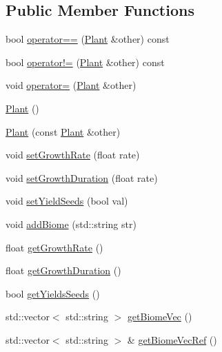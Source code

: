 \subsection*{Public Member Functions}
\begin{DoxyCompactItemize}
\item 
bool \mbox{\hyperlink{class_plant_abe475b0daf524526b9680274ea0f8e2b}{operator==}} (\mbox{\hyperlink{class_plant}{Plant}} \&other) const
\item 
bool \mbox{\hyperlink{class_plant_a6ae96ef1da51ed164d62c400cbf9aa5a}{operator!=}} (\mbox{\hyperlink{class_plant}{Plant}} \&other) const
\item 
void \mbox{\hyperlink{class_plant_a10e2417c9c0e750666146443e76623ee}{operator=}} (\mbox{\hyperlink{class_plant}{Plant}} \&other)
\item 
\mbox{\hyperlink{class_plant_aeebba67fbf33e3087e9035f41289a83a}{Plant}} ()
\item 
\mbox{\hyperlink{class_plant_a3e454c81c5a9120c4b321614b22621c1}{Plant}} (const \mbox{\hyperlink{class_plant}{Plant}} \&other)
\item 
void \mbox{\hyperlink{class_plant_af55fc2a9b7b3833ecc305f7fe19fd5dd}{set\+Growth\+Rate}} (float rate)
\item 
void \mbox{\hyperlink{class_plant_a3baeabf1c11ff1440b696cfe34f785f5}{set\+Growth\+Duration}} (float rate)
\item 
void \mbox{\hyperlink{class_plant_a21c26df7238a78906804603559f5cc04}{set\+Yield\+Seeds}} (bool val)
\item 
void \mbox{\hyperlink{class_plant_a32c7cc807dce6f0049fec8a8576a341d}{add\+Biome}} (std\+::string str)
\item 
float \mbox{\hyperlink{class_plant_a7f0844398279e81e7e65a7cea52faf45}{get\+Growth\+Rate}} ()
\item 
float \mbox{\hyperlink{class_plant_a76c9434c2b7f9a9edad3e07db344ce0f}{get\+Growth\+Duration}} ()
\item 
bool \mbox{\hyperlink{class_plant_a3144642078f06af87392cdd27612b12b}{get\+Yields\+Seeds}} ()
\item 
std\+::vector$<$ std\+::string $>$ \mbox{\hyperlink{class_plant_a1c0df266a43944cb5f0565c298259340}{get\+Biome\+Vec}} ()
\item 
std\+::vector$<$ std\+::string $>$ \& \mbox{\hyperlink{class_plant_aa8d8046f942713a0d455accd0f86509f}{get\+Biome\+Vec\+Ref}} ()
\end{DoxyCompactItemize}
